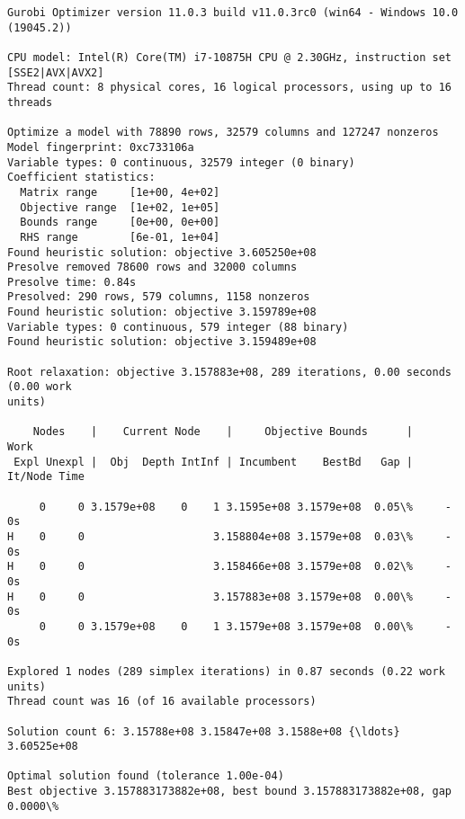 \documentclass[11pt]{article}
\begin{document}
    \begin{Verbatim}[commandchars=\\\{\}]
Gurobi Optimizer version 11.0.3 build v11.0.3rc0 (win64 - Windows 10.0
(19045.2))

CPU model: Intel(R) Core(TM) i7-10875H CPU @ 2.30GHz, instruction set
[SSE2|AVX|AVX2]
Thread count: 8 physical cores, 16 logical processors, using up to 16 threads

Optimize a model with 78890 rows, 32579 columns and 127247 nonzeros
Model fingerprint: 0xc733106a
Variable types: 0 continuous, 32579 integer (0 binary)
Coefficient statistics:
  Matrix range     [1e+00, 4e+02]
  Objective range  [1e+02, 1e+05]
  Bounds range     [0e+00, 0e+00]
  RHS range        [6e-01, 1e+04]
Found heuristic solution: objective 3.605250e+08
Presolve removed 78600 rows and 32000 columns
Presolve time: 0.84s
Presolved: 290 rows, 579 columns, 1158 nonzeros
Found heuristic solution: objective 3.159789e+08
Variable types: 0 continuous, 579 integer (88 binary)
Found heuristic solution: objective 3.159489e+08

Root relaxation: objective 3.157883e+08, 289 iterations, 0.00 seconds (0.00 work
units)

    Nodes    |    Current Node    |     Objective Bounds      |     Work
 Expl Unexpl |  Obj  Depth IntInf | Incumbent    BestBd   Gap | It/Node Time

     0     0 3.1579e+08    0    1 3.1595e+08 3.1579e+08  0.05\%     -    0s
H    0     0                    3.158804e+08 3.1579e+08  0.03\%     -    0s
H    0     0                    3.158466e+08 3.1579e+08  0.02\%     -    0s
H    0     0                    3.157883e+08 3.1579e+08  0.00\%     -    0s
     0     0 3.1579e+08    0    1 3.1579e+08 3.1579e+08  0.00\%     -    0s

Explored 1 nodes (289 simplex iterations) in 0.87 seconds (0.22 work units)
Thread count was 16 (of 16 available processors)

Solution count 6: 3.15788e+08 3.15847e+08 3.1588e+08 {\ldots} 3.60525e+08

Optimal solution found (tolerance 1.00e-04)
Best objective 3.157883173882e+08, best bound 3.157883173882e+08, gap 0.0000\%
    \end{Verbatim}
\end{document}
